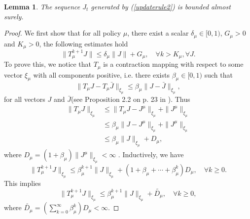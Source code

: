 \documentclass[12pt,a4paper]{amsart}
\numberwithin{equation}{section}
\theoremstyle{plain}
\newtheorem{Lemma}[Th]{Lemma}
\theoremstyle{definition}
\begin{document}
\begin{Lemma}\label{lmbounded2}
	The sequence $J_t$ generated by (\ref{updaterule2}) is bounded almost surely. 
\end{Lemma}
\begin{proof}
	We first show that for all policy $\mu$, there exist a scalar $\delta_{\mu} \in [0, 1)$,  $G_{\mu} > 0$ and $K_{\mu} > 0$, the following estimates hold
	\begin{equation} \label{wnb}
	\|T_{\mu}^{k+1} J\|  \le \delta_{\mu} \| J\| + G_{\mu}, \quad \forall k > K_{\mu}, \forall J .
	\end{equation}
	To prove this, we notice that $T_{\mu}$ is a contraction mapping with respect to some vector $\xi_{\mu}$ with all components positive, i.e. there exists $\beta_{\mu} \in [0,1)$ such that 
	$$
	\|T_{\mu}J - T_{\mu} \bar{J}\|_{\xi_{\mu}}  \le \beta_{\mu} \|J - \bar{J}\|_{\xi_{\mu}},
	$$
	for all vectors $J$ and $\bar{J}$(see Proposition 2.2 on p. 23 in \cite{BertsekasTsitsiklis96}). Thus
	\begin{equation} \label{wnb2}
		\begin{aligned}
		\|T_{\mu} J\|_{\xi_{\mu}} & \le \|T_{\mu} J - J^{\mu}\|_{\xi_{\mu}} + \|J^{\mu}\|_{\xi_{\mu}} \\
		& \le \beta_{\mu} \| J - J^{\mu}\|_{\xi_{\mu}} + \|J^{\mu}\|_{\xi_{\mu}} \\
		& \le \beta_{\mu}\|J\|_{\xi_{\mu}} + D_{\mu},
		\end{aligned}
	\end{equation}
	where $D_{\mu} = (1+\beta_{\mu})\|J^{\mu}\|_{\xi_{\mu}} < \infty$ .  Inductively, we have
	$$
	\|T_{\mu}^{k + 1} J\|_{\xi_{\mu}} \le \beta_{\mu}^{k+1} \|J\|_{\xi_{\mu}} + (1+ \beta_{\mu} + \cdots + \beta_{\mu}^k)D_{\mu}, \quad \forall k \ge 0.
	$$
	This implies
	$$
	\|T_{\mu}^{k + 1} J\|_{\xi_{\mu}} \le \beta_{\mu}^{k+1} \|J\|_{\xi_{\mu}} + \tilde{D_{\mu}}, \quad \forall k \ge 0,
	$$
	where $\tilde{D_{\mu}} = (\sum_{k=0}^{\infty} \beta_{\mu}^k) D_{\mu} < \infty$.
	

\end{proof}
\end{document}
